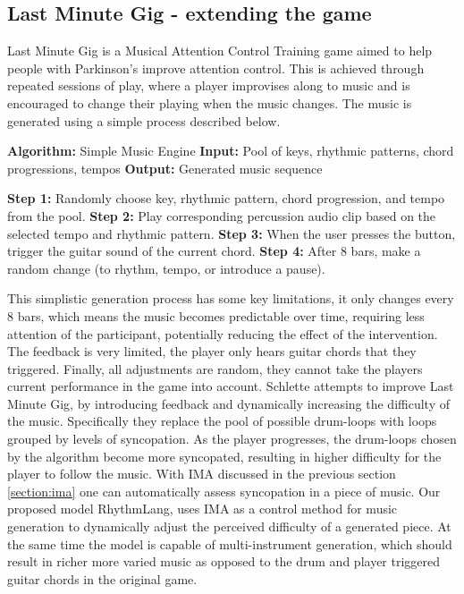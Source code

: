 \subsection{Last Minute Gig - extending the game}
Last Minute Gig \cite{Chalkiadakis_2022} is a Musical Attention Control Training game aimed to help people with Parkinson's improve attention control. This is achieved through repeated sessions of play, where a player improvises along to music and is encouraged to change their playing when the music changes. The music is generated using a simple process described below.

\begin{algorithmic}[H]
    \State \textbf{Algorithm:} Simple Music Engine
    \State \textbf{Input:} Pool of keys, rhythmic patterns, chord progressions, tempos
    \State \textbf{Output:} Generated music sequence
    \State
    
    \State \textbf{Step 1:} Randomly choose key, rhythmic pattern, chord progression, and tempo from the pool.
    \State \textbf{Step 2:} Play corresponding percussion audio clip based on the selected tempo and rhythmic pattern.
    \State \textbf{Step 3:} When the user presses the button, trigger the guitar sound of the current chord.
    \State \textbf{Step 4:} After 8 bars, make a random change (to rhythm, tempo, or introduce a pause).
    \end{algorithmic}
This simplistic generation process has some key limitations, it only changes every 8 bars, which means the music becomes predictable over time, requiring less attention of the participant, potentially reducing the effect of the intervention. The feedback is very limited, the player only hears guitar chords that they triggered. Finally, all adjustments are random, they cannot take the players current performance in the game into account. Schlette \cite{Schlette_2022} attempts to improve Last Minute Gig, by introducing feedback and dynamically increasing the difficulty of the music. Specifically they replace the pool of possible drum-loops with loops grouped by levels of syncopation. As the player progresses, the drum-loops chosen by the algorithm become more syncopated, resulting in higher difficulty for the player to follow the music. With IMA discussed in the previous section \ref{section:ima} one can automatically assess syncopation in a piece of music. Our proposed model RhythmLang, uses IMA as a control method for music generation to dynamically adjust the perceived difficulty of a generated piece. At the same time the model is capable of multi-instrument generation, which should result in richer more varied music as opposed to the drum and player triggered guitar chords in the original game.


